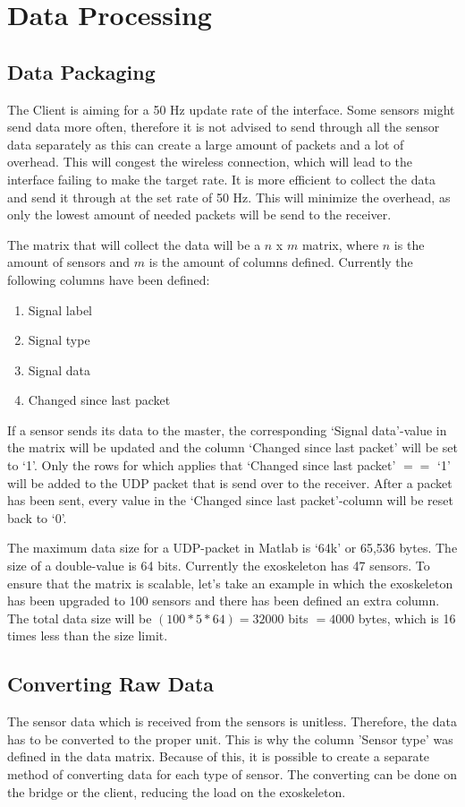 \section{Data Processing}\label{sec:dataproc}
\subsection{Data Packaging}\label{sec:datapac}
The Client is aiming for a 50 Hz update rate of the interface. Some sensors might send data more often, therefore it is not advised to send through all the sensor data separately as this can create a large amount of packets and a lot of overhead. This will congest the wireless connection, which will lead to the interface failing to make the target rate. It is more efficient to collect the data and send it through at the set rate of 50 Hz. This will minimize the overhead, as only the lowest amount of needed packets will be send to the receiver.

The matrix that will collect the data will be a $n$ x $m$ matrix, where $n$ is the amount of sensors and $m$ is the amount of columns defined. Currently the following columns have been defined:\\
\begin{enumerate}
	\item Signal label
	\item Signal type
	\item Signal data
	\item Changed since last packet
\end{enumerate}
If a sensor sends its data to the master, the corresponding `Signal data'-value in the matrix will be updated and the column `Changed since last packet' will be set to `1'. Only the rows for which applies that `Changed since last packet' $==$ `1' will be added to the UDP packet that is send over to the receiver. After a packet has been sent, every value in the `Changed since last packet'-column will be reset back to `0'.

The maximum data size for a UDP-packet in Matlab is `64k' or 65,536 bytes. The size of a double-value is 64 bits. Currently the exoskeleton has 47 sensors. To ensure that the matrix is scalable, let's take an example in which the exoskeleton has been upgraded to 100 sensors and there has been defined an extra column. The total data size will be $(100*5*64) = 32000$ bits $= 4000$ bytes, which is 16 times less than the size limit. 

\subsection{Converting Raw Data}
The sensor data which is received from the sensors is unitless. Therefore, the data has to be converted to the proper unit. This is why the column 'Sensor type' was defined in the data matrix. Because of this, it is possible to create a separate method of converting data for each type of sensor. The converting can be done on the bridge or the client,  reducing the load on the exoskeleton.